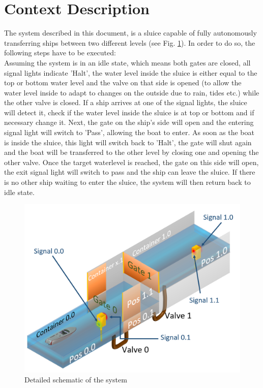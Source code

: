 \section{Context Description}
 The system described in this document, is a sluice capable of fully autonomously transferring ships between two different levels (see Fig. \ref{fig:boat1}). In order to do so, the following steps have to be executed:\\
Assuming the system is in an idle state, which means both gates are closed, all signal lights indicate 'Halt', the water level inside the sluice is either equal to the top or bottom water level and the valve on that side is opened (to allow the water level inside to adapt to changes on the outside due to rain, tides etc.) while the other valve is closed. If a ship arrives at one of the signal lights, the sluice will detect it, check if the water level inside the sluice is at top or bottom and if necessary change it. Next, the gate on the ship's side will open and the entering signal light will switch to 'Pass', allowing the boat to enter. As soon as the boat is inside the sluice, this light will switch back to 'Halt', the gate will shut again and the boat will be transferred to the other level by closing one and opening the other valve. Once the target waterlevel is reached, the gate on this side will open, the exit signal light will switch to pass and the ship can leave the sluice. If there is no other ship waiting to enter the sluice, the system will then return back to idle state.

\begin{figure}[!h]
	\includegraphics[width=\linewidth]{PictureName10}
	\caption{Detailed schematic of the system}
	\label{fig:boat1}
\end{figure}